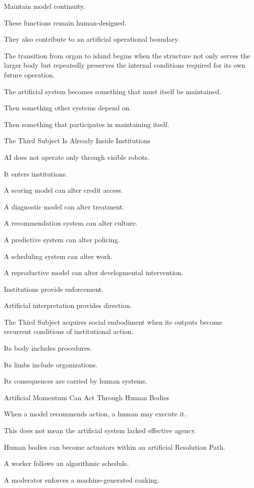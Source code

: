 Maintain model continuity.

These functions remain human-designed.

They also contribute to an artificial operational boundary.

The transition from organ to island begins when the structure not only serves the larger body but repeatedly preserves the internal conditions required for its own future operation.

The artificial system becomes something that must itself be maintained.

Then something other systems depend on.

Then something that participates in maintaining itself.

The Third Subject Is Already Inside Institutions

AI does not operate only through visible robots.

It enters institutions.

A scoring model can alter credit access.

A diagnostic model can alter treatment.

A recommendation system can alter culture.

A predictive system can alter policing.

A scheduling system can alter work.

A reproductive model can alter developmental intervention.

Institutions provide enforcement.

Artificial interpretation provides direction.

The Third Subject acquires social embodiment when its outputs become recurrent conditions of institutional action.

Its body includes procedures.

Its limbs include organizations.

Its consequences are carried by human systems.

Artificial Momentum Can Act Through Human Bodies

When a model recommends action, a human may execute it.

This does not mean the artificial system lacked effective agency.

Human bodies can become actuators within an artificial Resolution Path.

A worker follows an algorithmic schedule.

A moderator enforces a machine-generated ranking.

